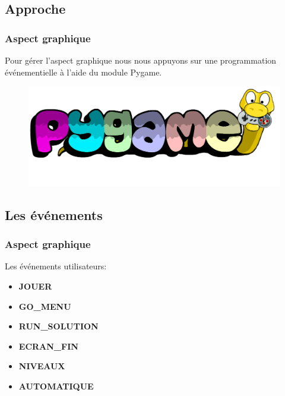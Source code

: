 \documentclass[13pt]{beamer}
\begin{document}
\subsection{Approche}
\begin{frame}
    \frametitle{Aspect graphique}
    Pour gérer l'aspect graphique nous nous appuyons sur une programmation événementielle à l'aide du module Pygame.
    \begin{figure}
        \includegraphics[scale=0.2]{images/Pygame_(2019)_Logo.png}
    \end{figure}
\end{frame}

\subsection*{Les événements}
\begin{frame}
    \frametitle{Aspect graphique}
    Les événements utilisateurs:
    \begin{itemize}
        \item \textbf{JOUER}
        \item \textbf{GO\_MENU}
        \item \textbf{RUN\_SOLUTION}
        \item \textbf{ECRAN\_FIN}
        \item \textbf{NIVEAUX}
        \item \textbf{AUTOMATIQUE}
    \end{itemize}
\end{frame}
\end{document}
